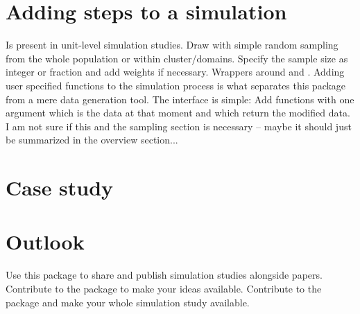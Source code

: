 \documentclass[article]{ajs}
\begin{document}
\section{Adding steps to a simulation}
Is present in unit-level simulation studies. Draw with simple random sampling from the whole population or within cluster/domains. Specify the sample size as integer or fraction and add weights if necessary. Wrappers around  and .
Adding user specified functions to the simulation process is what separates this package from a mere data generation tool. The interface is simple: Add functions with one argument which is the data at that moment and which return the modified data. I am not sure if this and the sampling section is necessary -- maybe it should just be summarized in the overview section...

\section{Case study}

\section{Outlook}
Use this package to share and publish simulation studies alongside papers. Contribute to the package to make your ideas available. Contribute to the package and make your whole simulation study available. 


%

\end{document}

